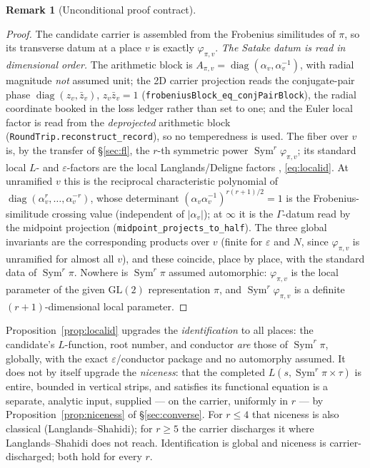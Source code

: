 \documentclass[11pt]{article}
\theoremstyle{definition}
\newtheorem{remark}[theorem]{Remark}
\newcommand{\Sym}{\operatorname{Sym}}
\begin{document}
\begin{remark}[Unconditional proof contract]
\begin{enumerate}
\begin{proof}
The candidate carrier is assembled from the Frobenius similitudes of $\pi$, so its transverse datum at a
place $v$ is exactly $\varphi_{\pi,v}$. \emph{The Satake datum is read in dimensional order.} The arithmetic
block is $A_{\pi,v}=\operatorname{diag}(\alpha_v,\alpha_v^{-1})$, with radial magnitude \emph{not} assumed
unit; the 2D carrier projection reads the conjugate-pair phase $\operatorname{diag}(z_v,\bar z_v)$, $z_v\bar
z_v=1$ (\texttt{frobeniusBlock\_eq\_conjPairBlock}), the radial coordinate booked in the loss ledger rather
than set to one; and the Euler local factor is read from the \emph{deprojected} arithmetic block
(\texttt{RoundTrip.reconstruct\_record}), so no temperedness is used. The fiber over $v$ is, by the transfer
of \S\ref{sec:fl}, the $r$-th symmetric power $\Sym^r\varphi_{\pi,v}$; its standard local $L$- and
$\varepsilon$-factors are the local Langlands/Deligne factors \cite{Tate}, \eqref{eq:localid}. At unramified
$v$ this is the reciprocal characteristic polynomial of
$\operatorname{diag}(\alpha_v^{r},\dots,\alpha_v^{-r})$, whose determinant
$(\alpha_v\alpha_v^{-1})^{r(r+1)/2}=1$ is the Frobenius-similitude crossing value (independent of
$|\alpha_v|$); at $\infty$ it is the $\Gamma$-datum read by the midpoint projection
(\texttt{midpoint\_projects\_to\_half}). The three global invariants are the corresponding products over
$v$ (finite for $\varepsilon$ and $N$, since $\varphi_{\pi,v}$ is unramified for almost all $v$), and
these coincide, place by place, with the standard data of $\Sym^r\pi$. Nowhere is $\Sym^r\pi$ assumed
automorphic: $\varphi_{\pi,v}$ is the local parameter of the given $\mathrm{GL}(2)$ representation $\pi$,
and $\Sym^r\varphi_{\pi,v}$ is a definite $(r{+}1)$-dimensional local parameter.
\end{proof}

Proposition~\ref{prop:localid} upgrades the \emph{identification} to all places: the candidate's
$L$-function, root number, and conductor \emph{are} those of $\Sym^r\pi$, globally, with the exact
$\varepsilon$/conductor package and no automorphy assumed. It does not by itself upgrade the \emph{niceness}: that
the completed $L(s,\Sym^r\pi\times\tau)$ is entire, bounded in vertical strips, and satisfies its
functional equation is a separate, analytic input, supplied --- on the carrier, uniformly in $r$ --- by
Proposition~\ref{prop:niceness} of \S\ref{sec:converse}. For $r\le4$ that niceness is also classical
(Langlands--Shahidi); for $r\ge5$ the carrier discharges it where Langlands--Shahidi does not reach.
Identification is global and niceness is carrier-discharged; both hold for every $r$.


\end{enumerate}
\end{remark}
\end{document}
